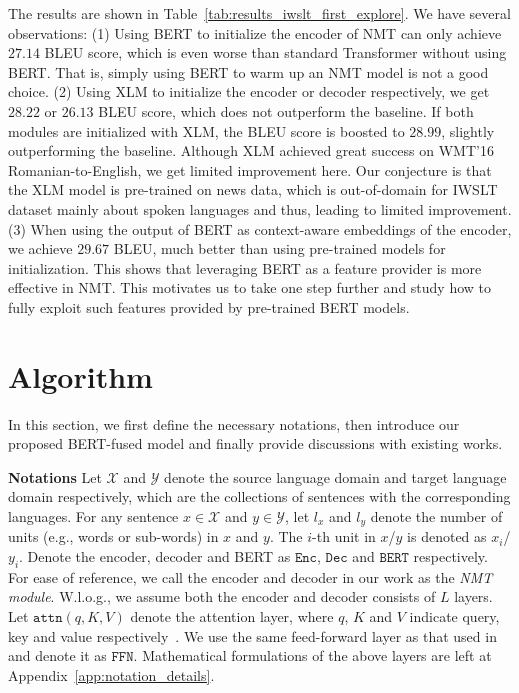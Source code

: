 \documentclass{article} \usepackage{iclr2020_conference,times}
\newcommand{\domX}{\mathcal{X}}
\newcommand{\domY}{\mathcal{Y}}
\newcommand{\bert}{\texttt{BERT}}
\newcommand{\enc}{\texttt{Enc}}
\newcommand{\dec}{\texttt{Dec}}
\newcommand{\attn}{\texttt{attn}}
\newcommand{\ffn}{\texttt{FFN}}
\begin{document}
The results are shown in Table~\ref{tab:results_iwslt_first_explore}. We have several observations: (1) Using BERT to initialize the encoder of NMT can only achieve $27.14$ BLEU score, which is even worse than standard Transformer without using BERT. That is, simply using BERT to warm up an NMT model is not a good choice. (2) Using XLM to initialize the encoder or decoder respectively, we get $28.22$ or $26.13$ BLEU score, which does not outperform the baseline. If both modules are initialized with XLM, the BLEU score is boosted to $28.99$, slightly outperforming the baseline. Although XLM achieved great success on WMT'16 Romanian-to-English, we get limited improvement here. Our conjecture is that the XLM model is pre-trained on news data, which is out-of-domain for IWSLT dataset mainly about spoken languages and thus, leading to limited improvement. (3) When using the output of BERT as context-aware embeddings of the encoder, we achieve $29.67$ BLEU, much better than using pre-trained models for initialization.  This shows that leveraging BERT as a feature provider is more effective in NMT. This motivates us to take one step further and study how to fully exploit such features provided by pre-trained BERT models.


\section{Algorithm}\label{sec:framework}
In this section, we first define the necessary notations, then introduce our proposed BERT-fused model and finally provide discussions with existing works. 

\noindent\textbf{Notations} Let $\domX$ and $\domY$ denote the source language domain and target language domain respectively, which are the collections of sentences with the corresponding languages. For any sentence $x\in\domX$ and $y\in\domY$, let $l_x$ and $l_y$ denote the number of units (e.g., words or sub-words) in $x$ and $y$. The $i$-th unit in $x$/$y$ is denoted as $x_i$/$y_i$. Denote the encoder, decoder and BERT as $\enc$, $\dec$ and $\bert$ respectively. For ease of reference, we call the encoder and decoder in our work as the {\em NMT module}. W.l.o.g., we assume both the encoder and decoder consists of $L$ layers. Let $\attn(q,K,V)$ denote the attention layer, where $q$, $K$ and $V$ indicate query, key and value respectively~\citep{vaswani2017attention}. We use the same feed-forward layer as that used in \citep{vaswani2017attention} and denote it as $\ffn$. Mathematical formulations of the above layers are left at Appendix~\ref{app:notation_details}.
\end{document}
